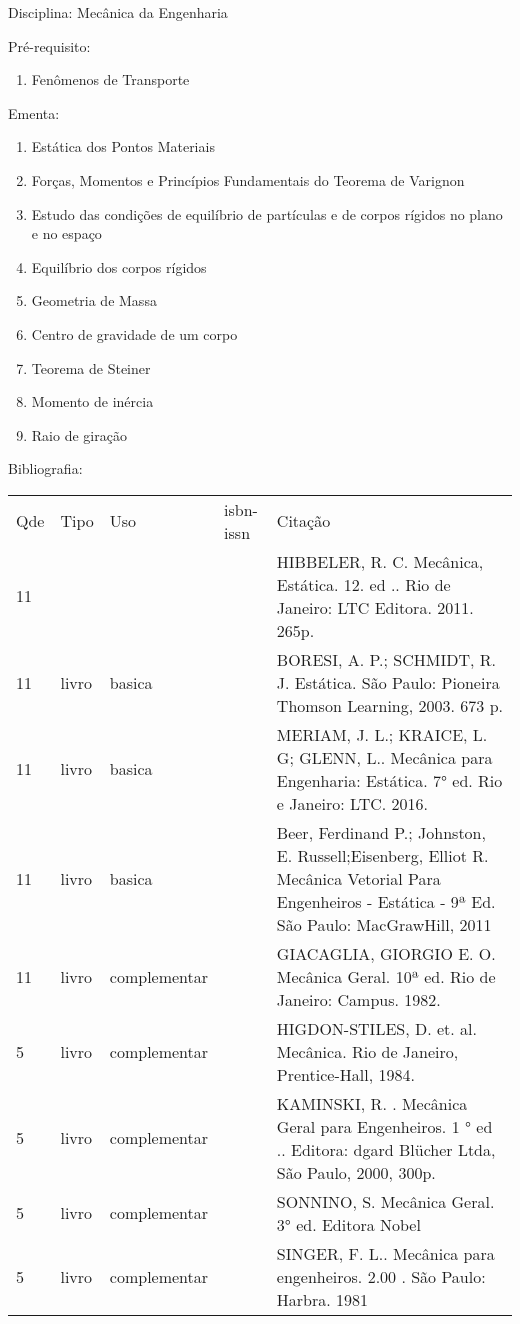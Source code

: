 \documentclass[12pt,a4paper,twoside]{report}
\begin{document}
Disciplina: Mecânica da Engenharia

Pré-requisito:
\begin{enumerate}
\item Fenômenos de Transporte
\end{enumerate}

Ementa:
\begin{enumerate}
\item Estática dos Pontos Materiais
\item Forças, Momentos e Princípios Fundamentais do Teorema de Varignon
\item Estudo das condições de equilíbrio de partículas e de corpos rígidos no plano e no espaço
\item Equilíbrio dos corpos rígidos
\item Geometria de Massa
\item Centro de gravidade de um corpo
\item Teorema de Steiner
\item Momento de inércia
\item Raio de giração
\end{enumerate}

Bibliografia:
\begin{tabular}{lllll}
Qde & Tipo & Uso & isbn-issn & Citação \\
11&&&&HIBBELER, R. C. Mecânica, Estática. 12. ed .. Rio de Janeiro: LTC Editora. 2011. 265p.\\
11&livro&basica&&BORESI, A. P.; SCHMIDT, R. J. Estática. São Paulo: Pioneira Thomson Learning, 2003. 673 p.\\
11&livro&basica&&MERIAM, J. L.; KRAICE, L. G; GLENN, L.. Mecânica para Engenharia: Estática. 7° ed. Rio e Janeiro: LTC. 2016.\\
11&livro&basica&&Beer, Ferdinand P.; Johnston, E. Russell;Eisenberg, Elliot R. Mecânica Vetorial Para Engenheiros - Estática - 9ª Ed. São Paulo: MacGrawHill, 2011\\
11&livro&complementar&&GIACAGLIA, GIORGIO E. O. Mecânica Geral. 10ª ed. Rio de Janeiro: Campus. 1982.\\
5&livro&complementar&&HIGDON-STILES, D. et. al. Mecânica. Rio de Janeiro, Prentice-Hall, 1984.\\
5&livro&complementar&&KAMINSKI, R.  . Mecânica Geral para Engenheiros. 1 ° ed .. Editora: dgard Blücher Ltda, São Paulo, 2000, 300p.\\
5&livro&complementar&&SONNINO, S. Mecânica Geral. 3° ed. Editora Nobel\\
5&livro&complementar&&SINGER, F. L.. Mecânica para engenheiros. 2.00 . São Paulo: Harbra. 1981\\
\end{tabular}
\end{document}
